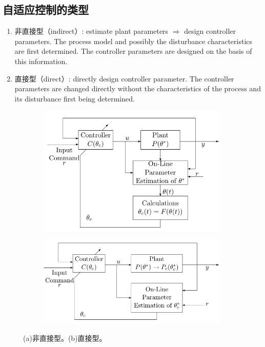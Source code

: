 \subsection{自适应控制的类型}
\begin{enumerate}
      \item 非直接型（indirect）: estimate plant parameters $\Rightarrow$ design
      controller parameters. The process model and possibly the disturbance
      characteristics are first determined. The controller parameters are
      designed on the basis of this information.
      
      \item 直接型（direct）: directly design controller parameter. The controller
      parameters are changed directly without the characteristics of the process
      and its disturbance first being determined.
\end{enumerate}
\begin{figure}[htbp]
  \centering
  \begin{subfigure}{0.45\textwidth}
    \includegraphics[width=1\linewidth]{figure/adaptive/indirect.png} %
    \caption{}
\end{subfigure}
  \begin{subfigure}{0.45\textwidth}
    \includegraphics[width=1\linewidth]{figure/adaptive/direct.png} %
    \caption{}
\end{subfigure}
\caption{(a)非直接型。(b)直接型。}
\label{direct_indirect}
\end{figure}
